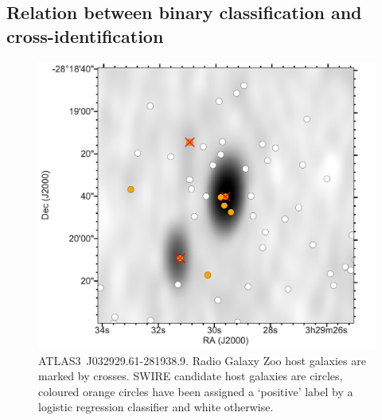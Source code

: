 \documentclass[fleqn,usenatbib,usedcolumn]{mnras}
\begin{document}
  \subsection{Relation between binary classification and cross-identification}
  \label{sec:relation}

    \begin{figure}
      \centering
      \includegraphics[width=\columnwidth]{images/positives.pdf}
      \caption{ATLAS3~J032929.61-281938.9. Radio Galaxy Zoo host galaxies are
      marked by crosses. SWIRE candidate host galaxies are circles, coloured orange
      circles have been assigned a `positive' label by a logistic regression
      classifier and white otherwise.
      \label{fig:positives}}
    \end{figure}
\end{document}
